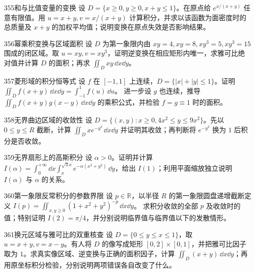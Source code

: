 \begin{exercise}{355}{和与比值变量的变换}
设 $D=\{x\geq0,y\geq0,x+y\leq1\}$。在原点给 $e^{x/(x+y)}$ 任意有限值。用 $u=x+y,v=x/(x+y)$ 计算积分，并求以该函数为面密度时的总质量及 $x+y$ 的加权平均值；说明变换在原点失效是否影响结果。
\end{exercise}

\begin{exercise}{356}{幂乘积变换与区域面积}
设 $D$ 为第一象限内由 $xy=4,xy=8,xy^3=5,xy^3=15$ 围成的闭区域。取 $u=xy,v=xy^3$，证明逆变换在相应矩形内唯一，求雅可比绝对值并计算 $D$ 的面积；再求 $\iint_Dxy\,\dd x\dd y$。
\end{exercise}

\begin{exercise}{357}{菱形域的积分恒等式}
设 $f$ 在 $[-1,1]$ 上连续，$D=\{|x|+|y|\leq1\}$。证明
$\iint_Df(x+y)\,\dd x\dd y=\int_{-1}^1f(u)\,\dd u$。
进一步设 $g$ 也连续，推导 $\iint_Df(x+y)g(x-y)\,\dd x\dd y$ 的乘积公式，并检验 $f=g\equiv1$ 时的面积。
\end{exercise}

\begin{exercise}{358}{无界曲边区域的收敛性}
设 $D=\{(x,y):x\geq0,4x^2\leq y\leq9x^2\}$。先以 $0\leq y\leq R$ 截断，计算 $\iint_Dxe^{-y^2}\,\dd x\dd y$ 并证明其收敛；再判断将 $e^{-y^2}$ 换为 $1$ 后积分是否收敛。
\end{exercise}

\begin{exercise}{359}{无界扇形上的高斯积分}
设 $\alpha>0$。证明并计算
$I(\alpha)=\int_0^{+\infty}\dd x\int_x^{\sqrt3x}e^{-\alpha(x^2+y^2)}\,\dd y$，给出 $I(1)$；利用平面缩放独立说明 $I(\alpha)$ 与 $\alpha$ 的关系。
\end{exercise}

\begin{exercise}{360}{第一象限反常积分的参数界限}
设 $p\in\mathbb R$，以半径 $R$ 的第一象限圆盘递增截断定义
$I(p)=\iint_{x,y\geq0}(1+x^2+y^2)^{-p}\,\dd x\dd y$。
求积分收敛的全部 $p$ 及收敛时的值；特别证明 $I(2)=\pi/4$，并分别说明临界值与临界值以下的发散情形。
\end{exercise}

\begin{exercise}{361}{换元区域与雅可比的双重核查}
设 $D=\{0\leq y\leq x\leq1\}$，取 $u=x+y,v=x-y$。有人将 $D$ 的像写成矩形 $[0,2]\times[0,1]$，并把雅可比因子取为 $1$。求真实像区域、逆变换与正确的面积因子，计算 $\iint_D(x+y)\,\dd x\dd y$；再用原坐标积分检验，分别说明两项错误各自改变了什么。
\end{exercise}

